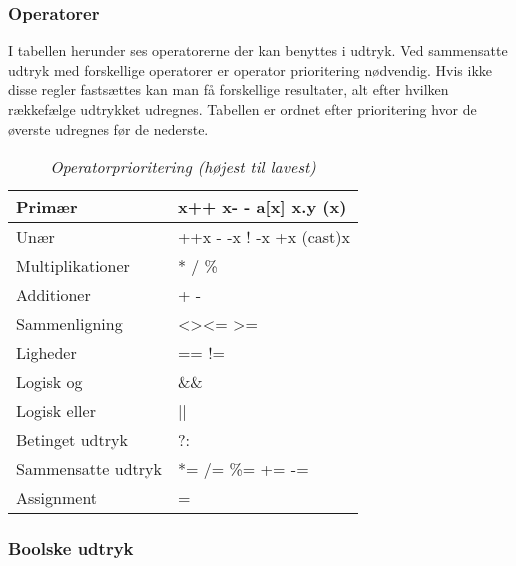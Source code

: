 \subsubsection{Operatorer}
I tabellen herunder ses operatorerne der kan benyttes i udtryk. Ved sammensatte udtryk med forskellige operatorer er operator prioritering nødvendig. Hvis ikke disse regler fastsættes kan man få forskellige resultater, alt efter hvilken rækkefælge udtrykket udregnes. Tabellen er ordnet efter prioritering hvor de øverste udregnes før de nederste. 
\begin{table}[H]
    \centering
    \begin{tabular}{|l|l|}
        \hline
        \centering

        Primær             & x++ \quad x- - \quad a{[}x{]} \quad x.y \quad (x)                 \\ \hline
        Unær               & ++x \quad - -x \quad ! \quad -x \quad +x \quad (cast)x       \\ \hline
        Multiplikationer   & * \quad / \quad \%                                               \\ \hline
        Additioner         & + \quad -                                                        \\ \hline
        Sammenligning      & \textless \quad \textgreater \quad \textless= \quad\textgreater= \\ \hline
        Ligheder           & == \quad !=                                                      \\ \hline
        Logisk og          & \&\&                                                              \\ \hline
        Logisk eller       & ||                                                               \\ \hline
        Betinget udtryk    & ?:                                                               \\ \hline
        Sammensatte udtryk & *= \quad /= \quad \%= \quad += \quad -=                          \\ \hline
        Assignment         & =                                                                \\ \hline

    \end{tabular}
    \caption{\textit{Operatorprioritering (højest til lavest)}}
    \label{tab:operatorprioritering}
\end{table}
\subsubsection{Boolske udtryk}

